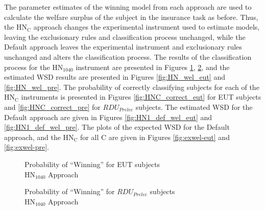 \documentclass[../main.tex]{subfiles}
\begin{document}
The parameter estimates of the winning model from each approach are used to calculate the welfare surplus of the subject in the insurance task as before.
Thus, the $\text{HN}_\text{C}$ approach changes the experimental instrument used to estimate models, leaving the exclusionary rules and classification process unchanged, while the Default approach leaves the experimental instrument and exclusionary rules unchanged and alters the classification process.
The results of the classification process for the $\text{HN}_{1040}$ instrument are presented in Figures \ref{fig:HN_win_eut}, \ref{fig:HN_win_pre}, and the estimated WSD results are presented in Figures \ref{fig:HN_wel_eut} and \ref{fig:HN_wel_pre}.
The probability of correctly classifying subjects for each of the $\text{HN}_\text{C}$ instruments is presented in Figures \ref{fig:HNC_correct_eut} for EUT subjects and \ref{fig:HNC_correct_pre} for $\mathit{RDU_{Prelec}}$ subjects.
The estimated WSD for the Default approach are given in Figures \ref{fig:HN1_def_wel_eut} and \ref{fig:HN1_def_wel_pre}.
The plots of the expected WSD for the Default approach, and the $\text{HN}_\text{C}$ for all C are given in Figures \ref{fig:exwel-eut} and \ref{fig:exwel-pre}.

\begin{figure}[h!]
	\center
	\caption{Probability of \enquote{Winning} for EUT subjects\\$\text{HN}_{1040}$ Approach}
	\label{fig:HN_win_eut}
\end{figure}

\begin{figure}[h!]
	\center
	\caption{Probability of \enquote{Winning} for $\mathit{RDU_{Prelec}}$ subjects\\$\text{HN}_{1040}$ Approach}
	\label{fig:HN_win_pre}
\end{figure}
\end{document}
